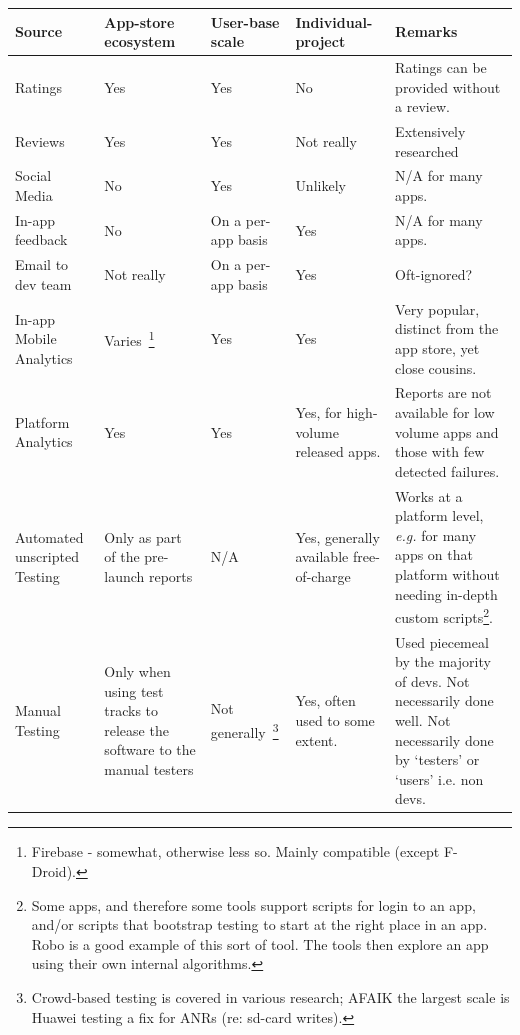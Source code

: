 \begin{table}[H]
	\setlength\tabcolsep{0.4em} %
	\def\arraystretch{1}%
	\footnotesize %
	\begin{tabular}{L{2cm} L{2.4cm} L{3cm} L{2.4cm} L{4cm}} %
		\toprule
		\textbf{Source} & \textbf{App-store ecosystem} & \textbf{User-base scale} & \textbf{Individual-project} & \textbf{Remarks} \\ \midrule
		Ratings & Yes & Yes & No & Ratings can be provided without a review. \\ \midrule
		Reviews & Yes & Yes & Not really & Extensively researched \\ \midrule
		Social Media & No & Yes & Unlikely & N/A for many apps. \\ \midrule
		In-app feedback & No & On a per-app basis & Yes & N/A for many apps. \\ \midrule
		Email to dev team & Not really & On a per-app basis & Yes & Oft-ignored? \\ \midrule
		In-app Mobile Analytics & Varies~\footnote{Firebase - somewhat, otherwise less so. Mainly compatible (except F-Droid).} & Yes & Yes & Very popular, distinct from the app store, yet close cousins. \\ \midrule
		Platform Analytics & Yes & Yes & Yes, for high-volume released apps. & Reports are not available for low volume apps and those with few detected failures.  \\ \midrule
		Automated unscripted Testing & Only as part of the pre-launch reports & N/A & Yes, generally available free-of-charge & Works at a platform level, \emph{e.g.} for many apps on that platform without needing in-depth custom scripts\footnote{ Some apps, and therefore some tools support scripts for login to an app, and/or scripts that bootstrap testing to start at the right place in an app. Robo is a good example of this sort of tool. The tools then explore an app using their own internal algorithms.}. \\ \midrule
		Manual Testing & Only when using test tracks to release the software to the manual testers & Not generally~\footnote{Crowd-based testing is covered in various research; AFAIK the largest scale is Huawei testing a fix for ANRs (re: sd-card writes).} & Yes, often used to some extent. & Used piecemeal by the majority of devs. Not necessarily done well. Not necessarily done by ‘testers’ or ‘users’ i.e. non devs. \\ \midrule

\end{tabular}
\end{table}
